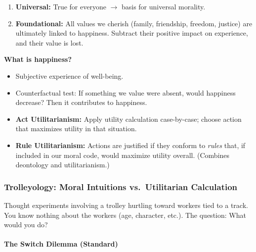 \begin{keybox}
\begin{enumerate}
  \item \textbf{Universal:} True for everyone $\to$ basis for universal morality.
  \item \textbf{Foundational:} All values we cherish (family, friendship, freedom, justice) are ultimately linked to happiness. Subtract their positive impact on experience, and their value is lost.
\end{enumerate}

\textbf{What is happiness?}
\begin{itemize}
  \item Subjective experience of well-being.
  \item Counterfactual test: If something we value were absent, would happiness decrease? Then it contributes to happiness.
\end{itemize}
\end{keybox}

\begin{thmbox}
\begin{itemize}
  \item \textbf{Act Utilitarianism:} Apply utility calculation case-by-case; choose action that maximizes utility in that situation.
  \item \textbf{Rule Utilitarianism:} Actions are justified if they conform to \textit{rules} that, if included in our moral code, would maximize utility overall. (Combines deontology and utilitarianism.)
\end{itemize}
\end{thmbox}

\bigseparator

\subsubsection{Trolleyology: Moral Intuitions vs.\ Utilitarian Calculation}

\begin{defbox}
Thought experiments involving a trolley hurtling toward workers tied to a track. You know nothing about the workers (age, character, etc.). The question: What would you do?
\end{defbox}

\separator

\paragraph*{The Switch Dilemma (Standard)}

